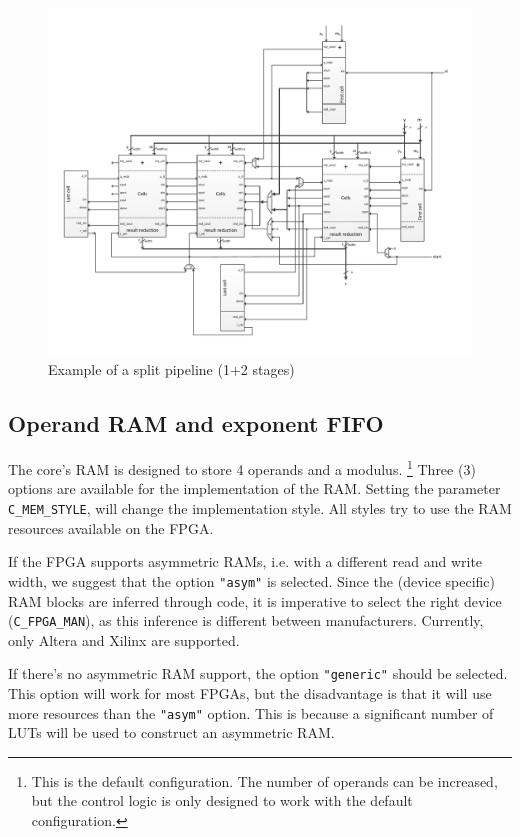 \newpage 
\begin{figure}[H]
\centering
\includegraphics[trim=1.2cm 1.2cm 1.2cm 1.2cm, width=22cm, angle=90]{pictures/sys_pipeline.pdf}
\caption{Example of a split pipeline (1+2 stages)}
\label{pipeline_structure_split}
\end{figure}
\newpage


\subsection{Operand RAM and exponent FIFO} \label{subsec:RAM_and_FIFO}
The core's RAM is designed to store 4 operands and a modulus. \footnote{This is the default configuration. The number of operands can be increased, but the control logic is only designed to work with the default configuration.} Three (3) options are available for the implementation of the RAM. Setting the parameter \verb|C_MEM_STYLE|, will change the implementation style. All styles try to use the RAM resources available on the FPGA.

If the FPGA supports asymmetric RAMs, i.e. with a different read and write width, we suggest that the option \verb|"asym"| is selected. Since the (device specific) RAM blocks are inferred through code, it is imperative to select the right device (\verb|C_FPGA_MAN|), as this inference is different between manufacturers. Currently, only Altera and Xilinx are supported.

If there's no asymmetric RAM support, the option \verb|"generic"| should be selected. This option will work for most FPGAs, but the disadvantage is that it will use more resources than the \verb|"asym"| option. This is because a significant number of LUTs will be used to construct an asymmetric RAM.

